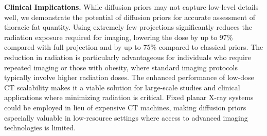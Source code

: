 \textbf{Clinical Implications. }While diffusion priors may not capture low-level details well, we demonstrate the potential of diffusion priors for accurate assessment of thoracic fat quantity.
Using extremely few projections significantly reduces the radiation exposure required for imaging, lowering the dose by up to 97\% compared with full projection and by up to 75\% compared to classical priors. 
The reduction in radiation is particularly advantageous for individuals who require repeated imaging or those with obesity, where standard imaging protocols typically involve higher radiation doses.
The enhanced performance of low-dose CT scalability makes it a viable solution for large-scale studies and clinical applications where minimizing radiation is critical. 
Fixed planar X-ray systems could be employed in lieu of expensive CT machines, making diffusion priors especially valuable in low-resource settings where access to advanced imaging technologies is limited.
